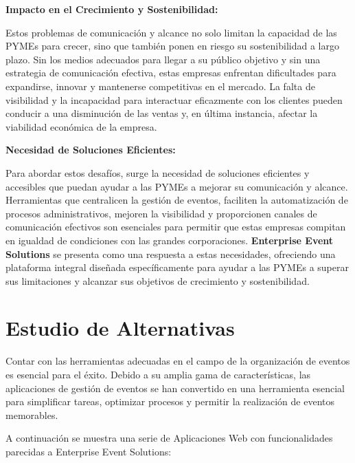 \textbf{Impacto en el Crecimiento y Sostenibilidad:}

Estos problemas de comunicación y alcance no solo limitan la capacidad de las PYMEs para crecer, sino que también ponen en riesgo su sostenibilidad 
a largo plazo. Sin los medios adecuados para llegar a su público objetivo y sin una estrategia de comunicación efectiva, estas empresas enfrentan 
dificultades para expandirse, innovar y mantenerse competitivas en el mercado. La falta de visibilidad y la incapacidad para interactuar eficazmente 
con los clientes pueden conducir a una disminución de las ventas y, en última instancia, afectar la viabilidad económica de la empresa.

\textbf{Necesidad de Soluciones Eficientes:}

Para abordar estos desafíos, surge la necesidad de soluciones eficientes y accesibles que puedan ayudar a las PYMEs a mejorar su comunicación y alcance. 
Herramientas que centralicen la gestión de eventos, faciliten la automatización de procesos administrativos, mejoren la visibilidad y proporcionen canales 
de comunicación efectivos son esenciales para permitir que estas empresas compitan en igualdad de condiciones con las grandes corporaciones. 
\textbf{Enterprise Event Solutions} se presenta como una respuesta a estas necesidades, ofreciendo una plataforma integral diseñada específicamente 
para ayudar a las PYMEs a superar sus limitaciones y alcanzar sus objetivos de crecimiento y sostenibilidad.


\section{Estudio de Alternativas}
Contar con las herramientas adecuadas en el campo de la organización de eventos es esencial para el éxito. Debido a su amplia gama de características, 
las aplicaciones de gestión de eventos se han convertido en una herramienta esencial para simplificar tareas, optimizar procesos y 
permitir la realización de eventos memorables.

A continuación se muestra una serie de Aplicaciones Web con funcionalidades parecidas a Enterprise Event Solutions:

